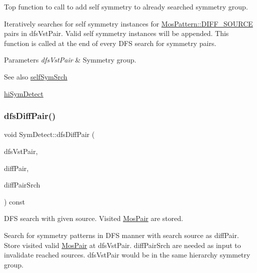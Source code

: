 Top function to call to add self symmetry to already searched symmetry group. 

Iteratively searches for self symmetry instances for \hyperlink{type_8h_af19eddb079bfea723256710b029c38e8ad45b64a7d6b85dde1b52dd5a18863933}{Mos\+Pattern\+::\+D\+I\+F\+F\+\_\+\+S\+O\+U\+R\+CE} pairs in dfs\+Vst\+Pair. Valid self symmetry instances will be appended. This function is called at the end of every D\+FS search for symmetry pairs.


\begin{DoxyParams}{Parameters}
{\em dfs\+Vst\+Pair} & Symmetry group.\\
\hline
\end{DoxyParams}
\begin{DoxySeeAlso}{See also}
\hyperlink{classSymDetect_ab6f286024b013fa257295111016da18b}{self\+Sym\+Srch} 

\hyperlink{classSymDetect_a81ec317ab0f508b3e0af483ef8a2c1ac}{hi\+Sym\+Detect} 
\end{DoxySeeAlso}
\mbox{\label{classSymDetect_acd33a2c834493240fc4e8840819d676c}} 
\subsubsection{\texorpdfstring{dfs\+Diff\+Pair()}{dfsDiffPair()}}
{\footnotesize\ttfamily void Sym\+Detect\+::dfs\+Diff\+Pair (\begin{DoxyParamCaption}\item[{std\+::vector$<$ \hyperlink{classMosPair}{Mos\+Pair} $>$ \&}]{dfs\+Vst\+Pair,  }\item[{\hyperlink{classMosPair}{Mos\+Pair} \&}]{diff\+Pair,  }\item[{std\+::vector$<$ \hyperlink{classMosPair}{Mos\+Pair} $>$ \&}]{diff\+Pair\+Srch }\end{DoxyParamCaption}) const\hspace{0.3cm}{\ttfamily [private]}}



D\+FS search with given source. Visited \hyperlink{classMosPair}{Mos\+Pair} are stored. 

Search for symmetry patterns in D\+FS manner with search source as diff\+Pair. Store visited valid \hyperlink{classMosPair}{Mos\+Pair} at dfs\+Vst\+Pair. diff\+Pair\+Srch are needed as input to invalidate reached sources. dfs\+Vst\+Pair would be in the same hierarchy symmetry group.

